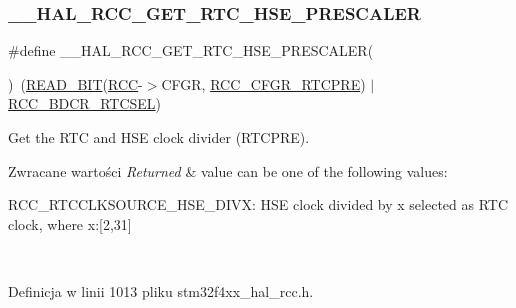 \subsubsection{\texorpdfstring{\+\_\+\+\_\+\+H\+A\+L\+\_\+\+R\+C\+C\+\_\+\+G\+E\+T\+\_\+\+R\+T\+C\+\_\+\+H\+S\+E\+\_\+\+P\+R\+E\+S\+C\+A\+L\+ER}{\_\_HAL\_RCC\_GET\_RTC\_HSE\_PRESCALER}}
{\footnotesize\ttfamily \#define \+\_\+\+\_\+\+H\+A\+L\+\_\+\+R\+C\+C\+\_\+\+G\+E\+T\+\_\+\+R\+T\+C\+\_\+\+H\+S\+E\+\_\+\+P\+R\+E\+S\+C\+A\+L\+ER(\begin{DoxyParamCaption}{ }\end{DoxyParamCaption})~(\hyperlink{group___exported__macro_ga822bb1bb9710d5f2fa6396b84e583c33}{R\+E\+A\+D\+\_\+\+B\+IT}(\hyperlink{group___peripheral__declaration_ga74944438a086975793d26ae48d5882d4}{R\+CC}-\/$>$C\+F\+GR, \hyperlink{group___peripheral___registers___bits___definition_gad7c067c52ecd135252c691aad32c0b83}{R\+C\+C\+\_\+\+C\+F\+G\+R\+\_\+\+R\+T\+C\+P\+RE}) $\vert$ \hyperlink{group___peripheral___registers___bits___definition_gabe30dbd38f6456990ee641648bc05d40}{R\+C\+C\+\_\+\+B\+D\+C\+R\+\_\+\+R\+T\+C\+S\+EL})}



Get the R\+TC and H\+SE clock divider (R\+T\+C\+P\+RE). 


\begin{DoxyRetVals}{Zwracane wartości}
{\em Returned} & value can be one of the following values\+: \begin{DoxyItemize}
\item R\+C\+C\+\_\+\+R\+T\+C\+C\+L\+K\+S\+O\+U\+R\+C\+E\+\_\+\+H\+S\+E\+\_\+\+D\+I\+V\+X\+: H\+SE clock divided by x selected as R\+TC clock, where x\+:\mbox{[}2,31\mbox{]} \end{DoxyItemize}
\\
\hline
\end{DoxyRetVals}


Definicja w linii 1013 pliku stm32f4xx\+\_\+hal\+\_\+rcc.\+h.

\mbox{\label{group___r_c_c___internal___r_t_c___clock___configuration_gad40d00ff1c984ebd011ea9f6e7f93c44}} 

